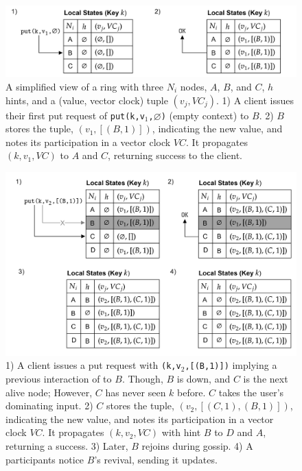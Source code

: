         \begin{figure}[h]
            
                \centering
                \includegraphics[width=\textwidth]{Sections/dyn/vc.png}
                \caption{A simplified view of a ring with three $N_i$ nodes, $A$, $B$, and $C$, $h$ hints, and a (value, vector clock) tuple $(v_j,VC_j)$. 1) A client issues their first put request of \texttt{put(k,v$_1$,$\varnothing$)} (empty context) to $B$. 2) $B$ stores the tuple, $(v_1, [(B,1)])$, 
                indicating the new value, and notes its participation in a vector clock $VC$. It propagates $(k,v_1,VC)$
                to $A$ and $C$, returning success to the client.}
                \label{fig:vc}
        \end{figure}
        
    
\newpage

\noindent
\begin{figure}[ht!]
    
        \centering
        \includegraphics[width=.95\textwidth]{Sections/dyn/vc_2.png}
        \caption{ 1) A client issues a put request with \texttt{(k,v$_2$,[(B,1)])} implying a previous interaction of to $B$. Though, $B$ is down, and $C$ is the next alive node; However, $C$ has never seen $k$ before. $C$ takes the user's dominating input.
        2) $C$ stores the tuple, $(v_2, [(C,1),(B,1)])$, indicating the new value, and notes its participation in a vector clock $VC$. It propagates $(k,v_2,VC)$ with hint $B$ to $D$ and $A$, returning a success. 3) Later, $B$ rejoins during gossip. 4) A participants notice $B$'s revival, sending it updates.}
        \label{fig:vc_2}
\end{figure}

